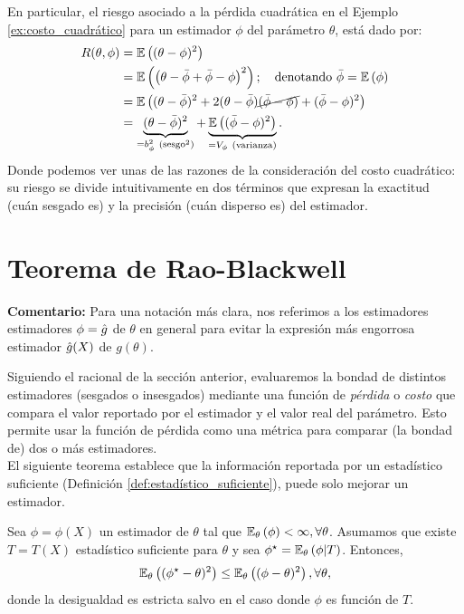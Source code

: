 En particular, el riesgo asociado a la pérdida cuadrática en el Ejemplo \ref{ex:costo_cuadrático} para un estimador $\phi$ del parámetro $\theta$, está dado por: 
\begin{alignat}{3}
 	R(\theta, \phi)  &= \E{(\theta - \phi)^2}\nonumber\\
 						& = \E{\left(\theta - \bar{\phi}+ \bar{\phi} -\phi\right)^2}; \quad \text{denotando }\bar{\phi} = \E{ \phi}\nonumber\\
 						& = \E{(\theta - \bar{\phi})^2+2(\theta - \bar{\phi})\cancel{(\bar{\phi} -\phi)} +  (\bar{\phi} -\phi)^2}\nonumber\\
 						& = \underbrace{(\theta - \bar{\phi})^2}_{=b_{\phi}^2\ (\text{sesgo}^2)} +  \underbrace{\E{(\bar{\phi} -\phi)^2}}_{=V_{\phi}\ \text{(varianza)}}.\label{eq:riesgo_cuad}
 \end{alignat} 
 Donde podemos ver unas de las razones de la consideración del costo cuadrático: su riesgo se divide intuitivamente en dos términos que expresan la exactitud (cuán sesgado es) y la precisión (cuán disperso es) del estimador.


\section{Teorema de Rao-Blackwell}
\textbf{Comentario:} Para una notación más clara, nos referimos  a los estimadores estimadores $\phi={ \hat{g}}$ de $\theta$ en general para evitar la expresión más engorrosa estimador ${ \hat{g}}(X)$ de $g(\theta)$.

Siguiendo el racional de la sección anterior, evaluaremos la bondad de distintos estimadores (sesgados o insesgados) mediante una función de \textit{pérdida} o \textit{costo} que compara el valor reportado por el estimador y el valor real del parámetro. Esto permite usar la función de pérdida como una métrica para comparar (la bondad de) dos o más estimadores.\\

El siguiente teorema establece que la información reportada por un estadístico suficiente (Definición \ref{def:estadístico_suficiente}), puede solo mejorar un estimador. 

\begin{theorem}
	\label{teo:rao-blackwell}
	Sea $\phi = \phi(X)$ un estimador de $\theta$ tal que $\mathbb{E}_\theta \left(\phi\right)<\infty, \forall \theta$. Asumamos que existe $T=T(X)$ estadístico suficiente para $\theta$ y sea $\phi^\star = \mathbb{E}_\theta \left(\phi|T\right)$. Entonces, 
	\begin{equation}
		\mathbb{E}_\theta \left((\phi^\star-\theta)^2\right) \leq \mathbb{E}_\theta \left((\phi-\theta)^2\right), \forall\theta,
	\end{equation}
	donde la desigualdad es estricta salvo en el caso donde $\phi$ es función de $T$.
\end{theorem}

